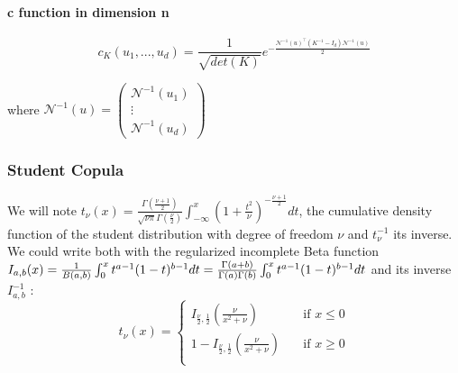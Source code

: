 \documentclass{article}
\begin{document}
	\paragraph{c function in dimension n}
	\begin{equation*}
	c_{K}(u_1,...,u_d)=\frac{1}{\sqrt{det(K)}}e^{-\frac{\mathcal{N}^{-1}(u)^\top (K^{-1}-I_{d}) \mathcal{N}^{-1}(u)}{2}}
	\end{equation*}

	where \begin{math} \mathcal{N}^{-1}(u) =  \begin{pmatrix}
   \mathcal{N}^{-1}(u_{1}) \\
  \vdots   \\
   \mathcal{N}^{-1}(u_{d})  
 \end{pmatrix}\end{math}



	\subsubsection{Student Copula}
	 We will note \begin{math} t_\nu(x)=\frac{\Gamma (\frac{\nu+1}{2})}{\sqrt{\nu \pi} \Gamma (\frac{\nu}{2})}\int_{-\infty}^{x} \left(1+\frac{t^2}{\nu}\right)^{-\frac{\nu +1}{2}}dt \end{math}, the cumulative density function of the student distribution with degree of freedom \begin{math} \nu \end{math} and \begin{math}  t_\nu^{-1} \end{math} its inverse. \newline
	We could write both with the regularized incomplete Beta function \newline \begin{math} I_{a,b}(x) = \frac{1}{B(a,b)} \int_{0}^{x} t^{a-1}(1-t)^{b-1}dt \newline = \frac{\Gamma (a+b)}{\Gamma (a)\Gamma (b)} \int_{0}^{x} t^{a-1}(1-t)^{b-1}dt\end{math} \newline
	\newline
	and its inverse \begin{math} I_{a,b}^{-1} \end{math} : \newline
	\[
   		t_\nu (x) =  \begin{cases}
        I_{\frac{\nu}{2},\frac{1}{2}}(\frac{\nu}{x^2+\nu})  & \quad \text{if } x \leq 0 \\
    	1-I_{\frac{\nu}{2},\frac{1}{2}}(\frac{\nu}{x^2+\nu}) & \quad \text{if } x \geq 0\\
  	\end{cases}
  	\]
  	
\end{document}
